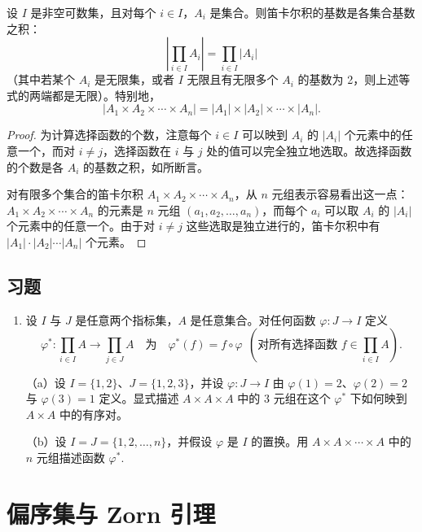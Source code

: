 \begin{proposition}\label{pro:A.1}
设 \(I\) 是非空可数集，且对每个 \(i \in I\)，\(A_i\) 是集合。则笛卡尔积的基数是各集合基数之积：
\[
\left|\prod_{i \in I}A_i\right| = \prod_{i \in I}|A_i|
\]
（其中若某个 \(A_i\) 是无限集，或者 \(I\) 无限且有无限多个 \(A_i\) 的基数为 2，则上述等式的两端都是无限）。特别地，
\[
|A_1 \times A_2 \times \cdots \times A_n| = |A_1| \times |A_2| \times \cdots \times |A_n|.
\]
\end{proposition}

\begin{proof}
为计算选择函数的个数，注意每个 \(i \in I\) 可以映到 \(A_i\) 的 \(|A_i|\) 个元素中的任意一个，而对 \(i \neq j\)，选择函数在 \(i\) 与 \(j\) 处的值可以完全独立地选取。故选择函数的个数是各 \(A_i\) 的基数之积，如所断言。

对有限多个集合的笛卡尔积 \(A_1 \times A_2 \times \cdots \times A_n\)，从 \(n\) 元组表示容易看出这一点：\(A_1 \times A_2 \times \cdots \times A_n\) 的元素是 \(n\) 元组 \((a_1, a_2, \ldots, a_n)\)，而每个 \(a_i\) 可以取 \(A_i\) 的 \(|A_i|\) 个元素中的任意一个。由于对 \(i \neq j\) 这些选取是独立进行的，笛卡尔积中有 \(|A_1| \cdot |A_2| \cdots |A_n|\) 个元素。
\end{proof}

\subsection*{习题}

\begin{enumerate}
\item 设 \(I\) 与 \(J\) 是任意两个指标集，\(A\) 是任意集合。对任何函数 \(\varphi : J \to I\) 定义
\[
\varphi^* : \prod_{i \in I}A \to \prod_{j \in J}A \quad \text{为} \quad \varphi^*(f) = f \circ \varphi \ \ (\text{对所有选择函数 } f \in \prod_{i \in I}A).
\]

（a）设 \(I = \{1, 2\}\)、\(J = \{1, 2, 3\}\)，并设 \(\varphi : J \to I\) 由 \(\varphi(1) = 2\)、\(\varphi(2) = 2\) 与 \(\varphi(3) = 1\) 定义。显式描述 \(A \times A \times A\) 中的 3 元组在这个 \(\varphi^*\) 下如何映到 \(A \times A\) 中的有序对。

（b）设 \(I = J = \{1, 2, \ldots, n\}\)，并假设 \(\varphi\) 是 \(I\) 的置换。用 \(A \times A \times \cdots \times A\) 中的 \(n\) 元组描述函数 \(\varphi^*\).
\end{enumerate}

\section{偏序集与 Zorn 引理}

